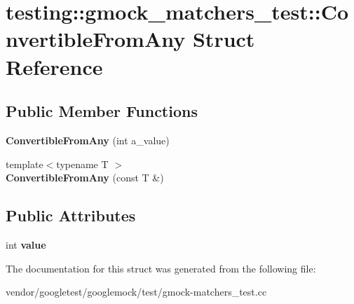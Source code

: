 \hypertarget{structtesting_1_1gmock__matchers__test_1_1_convertible_from_any}{}\section{testing\+:\+:gmock\+\_\+matchers\+\_\+test\+:\+:Convertible\+From\+Any Struct Reference}
\label{structtesting_1_1gmock__matchers__test_1_1_convertible_from_any}
\subsection*{Public Member Functions}
\begin{DoxyCompactItemize}
\item 
\mbox{\label{structtesting_1_1gmock__matchers__test_1_1_convertible_from_any_abca53d1044492f06ca3022af48881642}} 
{\bfseries Convertible\+From\+Any} (int a\+\_\+value)
\item 
\mbox{\label{structtesting_1_1gmock__matchers__test_1_1_convertible_from_any_a0963e24be9e1787fd8b9a3a7b7240fc7}} 
{\footnotesize template$<$typename T $>$ }\\{\bfseries Convertible\+From\+Any} (const T \&)
\end{DoxyCompactItemize}
\subsection*{Public Attributes}
\begin{DoxyCompactItemize}
\item 
\mbox{\label{structtesting_1_1gmock__matchers__test_1_1_convertible_from_any_a7d18bc7eb4d6eaae32d581e7c204f917}} 
int {\bfseries value}
\end{DoxyCompactItemize}


The documentation for this struct was generated from the following file\+:\begin{DoxyCompactItemize}
\item 
vendor/googletest/googlemock/test/gmock-\/matchers\+\_\+test.\+cc\end{DoxyCompactItemize}
